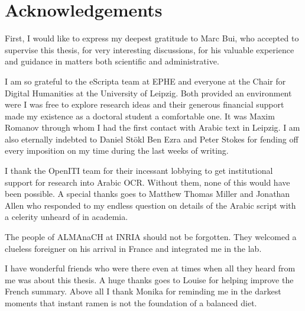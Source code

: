 \chapter*{Acknowledgements}
\thispagestyle{empty}

First, I would like to express my deepest gratitude to Marc Bui, who
accepted to supervise this thesis, for very interesting discussions, for his
valuable experience and guidance in matters both scientific and administrative.

I am so grateful to the eScripta team at EPHE and everyone at the Chair for
Digital Humanities at the University of Leipzig. Both provided an environment
were I was free to explore research ideas and their generous financial support
made my existence as a doctoral student a comfortable one. It was Maxim Romanov
through whom I had the first contact with Arabic text in Leipzig. I am also
eternally indebted to Daniel Stökl Ben Ezra and Peter Stokes for fending off
every imposition on my time during the last weeks of writing. 

I thank the OpenITI team for their incessant lobbying to get institutional
support for research into Arabic OCR. Without them, none of this would have
been possible. A special thanks goes to Matthew Thomas Miller and Jonathan
Allen who responded to my endless question on details of the Arabic script with
a celerity unheard of in academia.

The people of ALMAnaCH at INRIA should not be forgotten. They welcomed a
clueless foreigner on his arrival in France and integrated me in the lab.

I have wonderful friends who were there even at times when all they heard from
me was about this thesis. A huge thanks goes to Louise for helping improve the
French summary. Above all I thank Monika for reminding me in the darkest
moments that instant ramen is not the foundation of a balanced diet.

